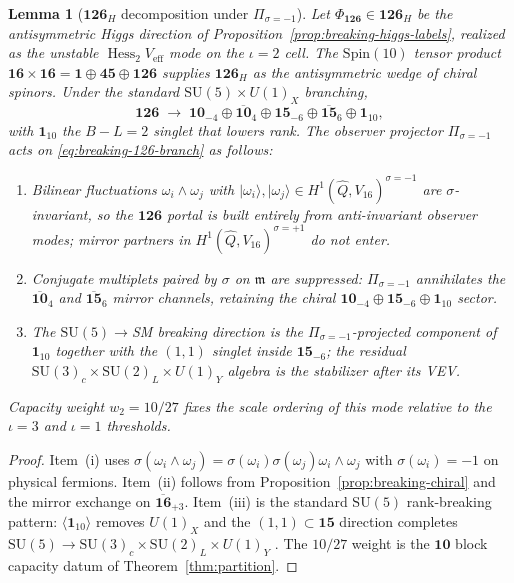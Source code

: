 \documentclass[11pt]{article}
\theoremstyle{plain}
\newtheorem{lemma}[theorem]{Lemma}
\theoremstyle{definition}
\theoremstyle{remark}
\numberwithin{equation}{section}
\newcommand{\Spin}{\mathrm{Spin}}
\newcommand{\Hess}{\operatorname{Hess}}
\begin{document}
\begin{lemma}[$\mathbf{126}_H$ decomposition under $\Pi_{\sigma=-1}$]
\label{lem:breaking-126-sigma}
Let $\Phi_{\mathbf{126}}\in\mathbf{126}_H$ be the antisymmetric Higgs direction
of Proposition~\ref{prop:breaking-higgs-labels}, realized as the unstable
$\Hess_2 V_{\mathrm{eff}}$ mode on the $\iota=2$ cell. The $\Spin(10)$ tensor
product $\mathbf{16}\times\mathbf{16}=\mathbf{1}\oplus\mathbf{45}\oplus
\mathbf{126}$ supplies $\mathbf{126}_H$ as the antisymmetric wedge of chiral
spinors. Under the standard $\mathrm{SU}(5)\times U(1)_X$ branching,
\begin{equation}\label{eq:breaking-126-branch}
  \mathbf{126}
  \;\longrightarrow\;
  \mathbf{10}_{-4}\oplus\overline{\mathbf{10}}_{4}
  \oplus\mathbf{15}_{-6}\oplus\overline{\mathbf{15}}_{6}
  \oplus\mathbf{1}_{10},
\end{equation}
with $\mathbf{1}_{10}$ the $B\!-\!L=2$ singlet that lowers rank. The observer
projector $\Pi_{\sigma=-1}$ acts on \eqref{eq:breaking-126-branch} as follows:
\begin{enumerate}[label=(\roman*),leftmargin=*]
  \item Bilinear fluctuations $\omega_i\wedge\omega_j$ with
    $|\omega_i\rangle,|\omega_j\rangle\in H^1(\hat Q,V_{16})^{\sigma=-1}$
    are $\sigma$-invariant, so the $\mathbf{126}$ portal is built entirely from
    anti-invariant observer modes; mirror partners in
    $H^1(\hat Q,V_{16})^{\sigma=+1}$ do not enter.
  \item Conjugate multiplets paired by $\sigma$ on $\mathfrak{m}$ are suppressed:
    $\Pi_{\sigma=-1}$ annihilates the $\overline{\mathbf{10}}_{4}$ and
    $\overline{\mathbf{15}}_{6}$ mirror channels, retaining the chiral
    $\mathbf{10}_{-4}\oplus\mathbf{15}_{-6}\oplus\mathbf{1}_{10}$ sector.
  \item The $\mathrm{SU}(5)\to$SM breaking direction is the
    $\Pi_{\sigma=-1}$-projected component of $\mathbf{1}_{10}$ together with
    the $(1,1)$ singlet inside $\mathbf{15}_{-6}$; the residual
    $\mathrm{SU}(3)_c\times\mathrm{SU}(2)_L\times U(1)_Y$ algebra is the
    stabilizer after its VEV.
\end{enumerate}
Capacity weight $w_2=10/27$ fixes the scale ordering of this mode relative to
the $\iota=3$ and $\iota=1$ thresholds.
\end{lemma}

\begin{proof}
Item~(i) uses $\sigma(\omega_i\wedge\omega_j)=\sigma(\omega_i)\sigma(\omega_j)
\omega_i\wedge\omega_j$ with $\sigma(\omega_i)=-1$ on physical fermions.
Item~(ii) follows from Proposition~\ref{prop:breaking-chiral} and the mirror
exchange on $\overline{\mathbf{16}}_{+3}$. Item~(iii) is the standard
$\mathrm{SU}(5)$ rank-breaking pattern: $\langle\mathbf{1}_{10}\rangle$ removes
$U(1)_X$ and the $(1,1)\subset\mathbf{15}$ direction completes
$\mathrm{SU}(5)\to\mathrm{SU}(3)_c\times\mathrm{SU}(2)_L\times U(1)_Y$
\cite{GeorgiGlashow1974,Witten1985}. The $10/27$ weight is the $\mathbf{10}$
block capacity datum of Theorem~\ref{thm:partition}.
\end{proof}
\end{document}
